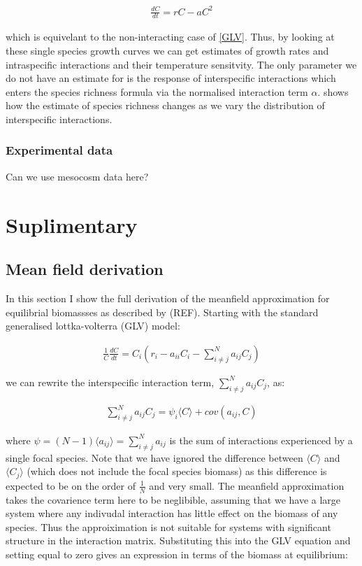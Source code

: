 \documentclass{article}
\begin{document}
\begin{align}
  \frac{dC}{dt} = rC - aC^2
\end{align}

which is equivelant to the non-interacting case of \cref{GLV}. Thus, by looking at these single species growth curves we can get estimates of growth rates and intraspecific interactions and their temperature sensitvity. The only parameter we do not have an estimate for is the response of interspecific interactions which enters the species richness formula via the normalised interaction term $\alpha$.  shows how the estimate of species richness changes as we vary the distribution of interspecific interactions.

\subsubsection{Experimental data}

Can we use mesocosm data here?

\section{Suplimentary}
\subsection{Mean field derivation}

In this section I show the full derivation of the meanfield approximation for equilibrial biomassses as described by (REF). Starting with the standard generalised lottka-volterra (GLV) model:

\begin{align}
  \frac{1}{C} \frac{dC}{dt} = C_i (r_i - a_{ii} C_i - \sum^N_{i \neq j} a_{ij} C_j)
\end{align}

we can rewrite the interspecific interaction term, $\sum^N_{i \neq j} a_{ij} C_j$, as:

\begin{align}
  \sum^N_{i \neq j} a_{ij} C_j = \psi_i \langle C \rangle + cov(a_{ij},C)
\end{align}

where $\psi = (N-1) \langle a_{ij} \rangle = \sum^N_{i \neq j} a_{ij}$ is the sum of interactions experienced by a single focal species. Note that we have ignored the difference between $\langle C \rangle$ and $\langle C_j \rangle$ (which does not include the focal species biomass) as this difference is expected to be on the order of $\frac{1}{N}$ and very small. The meanfield approximation takes the covarience term here to be neglibible, assuming that we have a large system where any indivudal interaction has little effect on the biomass of any species. Thus the approiximation is not suitable for systems with significant structure in the interaction matrix. Substituting this into the GLV equation and setting equal to zero gives an expression in terms of the biomass at equilibrium:
\end{document}
